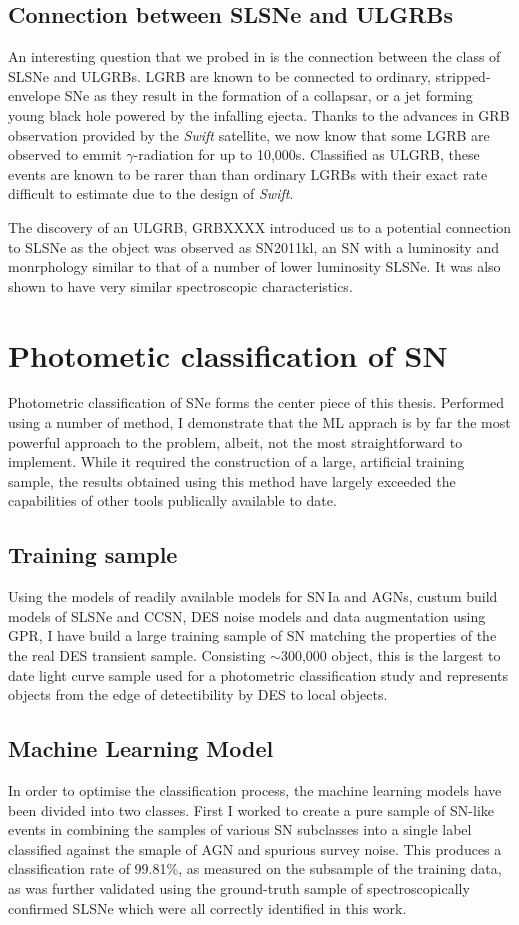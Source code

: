 \subsection{Connection between SLSNe and ULGRBs}
An interesting question that we probed in \citet{Prajs2016} is the connection between the class of SLSNe and ULGRBs. LGRB are known to be connected to ordinary, stripped-envelope SNe as they result in the formation of a collapsar, or a jet forming young black hole powered by the infalling ejecta. Thanks to the advances in GRB observation provided by the \textit{Swift} satellite, we now know that some LGRB are observed to emmit $\gamma$-radiation for up to 10,000s. Classified as ULGRB, these events are known to be rarer than than ordinary LGRBs with their exact rate difficult to estimate due to the design of \textit{Swift}.

The discovery of an ULGRB, GRBXXXX introduced us to a potential connection to SLSNe as the object was observed as SN2011kl, an SN with a luminosity and monrphology similar to that of a number of lower luminosity SLSNe. It was also shown to have very similar spectroscopic characteristics.

\section{Photometic classification of SN}
Photometric classification of SNe forms the center piece of this thesis. Performed using a number of method, I demonstrate that the ML apprach is by far the most powerful approach to the problem, albeit, not the most straightforward to implement. While it required the construction of a large, artificial training sample, the results obtained using this method have largely exceeded the capabilities of other tools publically available to date. 

\subsection{Training sample}
Using the models of readily available models for SN\,Ia and AGNs, custum build models of SLSNe and CCSN, DES noise models and data augmentation using GPR, I have build a large training sample of SN matching the properties of the the real DES transient sample. Consisting $\sim$300,000 object, this is the largest to date light curve sample used for a photometric classification study and represents objects from the edge of detectibility by DES to local objects.

\subsection{Machine Learning Model}
In order to optimise the classification process, the machine learning models have been divided into two classes. First I worked to create a pure sample of SN-like events in combining the samples of various SN subclasses into a single label classified against the smaple of AGN and spurious survey noise. This produces a classification rate of 99.81\%, as measured on the subsample of the training data, as was further validated using the ground-truth sample of spectroscopically confirmed SLSNe which were all correctly identified in this work.

